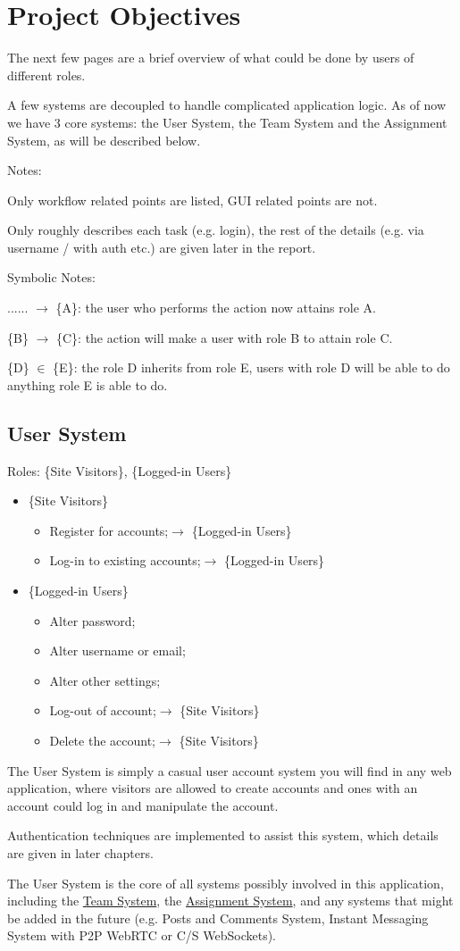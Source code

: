 \documentclass[12pt]{report}
\newcommand{\n}{\par}
\newcommand{\br}{\vspace{1 em}\n}
\begin{document}
\section{Project Objectives} \label{overview.project-objectives}
The next few pages are a brief overview of what could be done by users of different roles.\n
A few systems are decoupled to handle complicated application logic.
As of now we have 3 core systems: the User System, the Team System and the Assignment System,
as will be described below.
\br
Notes:\n
Only workflow related points are listed, GUI related points are not.\n
Only roughly describes each task (e.g. login),
the rest of the details (e.g. via username / with auth etc.) are given later in the report.
\br
Symbolic Notes:\n
...... $\rightarrow$ \{A\}: the user who performs the action now attains role A.\n
\{B\} $\rightarrow$ \{C\}: the action will make a user with role B to attain role C.\n
\{D\} $\in$ \{E\}: the role D inherits from role E, users with role D will be able to do anything role E is able to do.
\subsection{User System} \label{overview.project-objectives.user-system}
Roles: \{Site Visitors\}, \{Logged-in Users\}\n
\begin{itemize}
	\item \{Site Visitors\}
	      \begin{itemize}
		      \item Register for accounts;\null\hfill $\rightarrow$ \{Logged-in Users\}
		      \item Log-in to existing accounts;\null\hfill $\rightarrow$ \{Logged-in Users\}
	      \end{itemize}
	\item \{Logged-in Users\}
	      \begin{itemize}
		      \item Alter password;
		      \item Alter username or email;
		      \item Alter other settings;
		      \item Log-out of account;\null\hfill $\rightarrow$ \{Site Visitors\}
		      \item Delete the account;\null\hfill $\rightarrow$ \{Site Visitors\}
	      \end{itemize}
\end{itemize}\n
The User System is simply a casual user account system you will find in any web application,
where visitors are allowed to create accounts and ones with an account could log in and manipulate the account.
\br
Authentication techniques are implemented to assist this system, which details are given in later chapters.
\br
The User System is the core of all systems possibly involved in this application,
including the \hyperref[overview.project-objectives.team-system]{Team System},
the \hyperref[overview.project-objectives.assignment-system]{Assignment System},
and any systems that might be added in the future (e.g. Posts and Comments System, Instant Messaging System with P2P WebRTC or C/S WebSockets).
\end{document}
